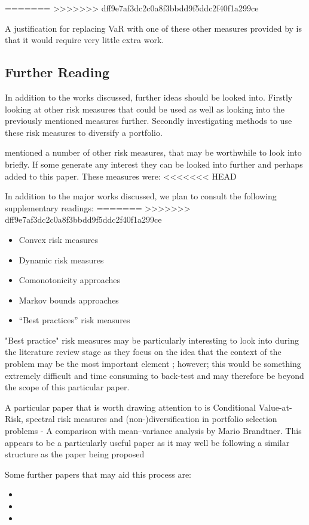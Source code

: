 \documentclass[12pt,a4paper]{article}
\newcommand{\bi}{\begin{itemize}}
\newcommand{\ei}{\end{itemize}}
\begin{document}
=======
>>>>>>> dff9e7af3dc2c0a8f3bbdd9f5ddc2f40f1a299ce

A justification for replacing VaR with one of these other measures provided by \cite{dowd2006after} is that it would require very little extra work. 

\subsection{Further Reading}
\label{subsec:FurRead}

In addition to the works discussed, further ideas should be looked into. Firstly looking at other risk measures that could be used as well as looking into the previously mentioned measures further. Secondly investigating methods to use these risk measures to diversify a portfolio. 

\cite{dowd2006after} mentioned a number of other risk measures, that may be worthwhile to look into briefly. If some generate any interest they can be looked into further and perhaps added to this paper. These measures were:
<<<<<<< HEAD

In addition to the major works discussed, we plan to consult the following supplementary readings:
=======
>>>>>>> dff9e7af3dc2c0a8f3bbdd9f5ddc2f40f1a299ce
\bi
\item Convex risk measures
\item Dynamic risk measures
\item Comonotonicity approaches
\item Markov bounds approaches
\item “Best practices” risk measures
\ei
 
 "Best practice" risk measures may be particularly interesting to look into during the literature review stage as they focus on the idea that the context of the problem may be the most important element \citep{dowd2006after}; however; this would be something extremely difficult and time consuming to back-test and may therefore be beyond the scope of this particular paper.

A particular paper that is worth drawing attention to is Conditional Value-at-Risk, spectral risk measures and
(non-)diversification in portfolio selection problems - A comparison with mean–variance analysis by Mario Brandtner. This appears to be a particularly useful paper as it may well be following a similar structure as the paper being proposed

Some further papers that may aid this process are: 
\bi
\item 
\item 
\item
\ei
\end{document}
